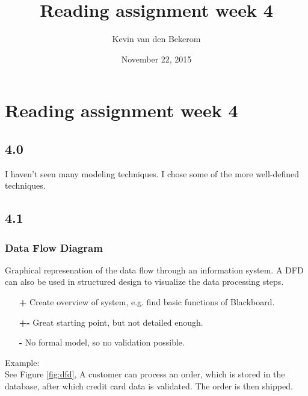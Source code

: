 

\title{Reading assignment week 4}
\newcommand{\TitelAbbr}{}
\newcommand{\Version}{0.1}



\what{}
\supervisors{}
\author{Kevin van den Bekerom}
\date{November 22, 2015}




\maketitle
\clearpage


\chapter*{Reading assignment week 4}

\section*{4.0}
I haven't seen many modeling techniques. I chose some of the more well-defined techniques.

\section*{4.1}

\subsection*{Data Flow Diagram \cite{dfd}}
Graphical represenation of the data flow through an information system. A DFD can also be used in structured design to visualize the data processing steps.
\begin{itemize}
	\item[\textbf{+}] Create overview of system, e.g. find basic functions of Blackboard.
	\item[\textbf{+-}] Great starting point, but not detailed enough.
	\item[\textbf{-}] No formal model, so no validation possible.
\end{itemize}

Example: \\
See Figure \ref{fig:dfd}, A customer can process an order, which is stored in the database, after which credit card data is validated. The order is then shipped. 

